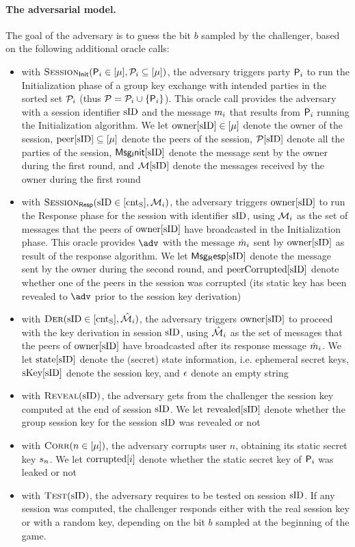 \paragraph{The adversarial model.}
The goal of the adversary is to guess the bit $b$ sampled by the challenger, based on the following additional oracle calls:
\begin{itemize}
	\item with $\GakeIniO ( \GIni  \in [\mu], \PartySet_{i} \subseteq [\mu])$, the adversary triggers party $\User[i]$ to run the Initialization phase of a group key exchange with intended parties in the sorted set $\PartySet_{i}$ (thus $\PartySet = \PartySet_{i}  \cup \{\User[i]\}$). This oracle call provides the adversary with a session identifier $\sID$ and the message $\GakeIniMes_{i}$ that results from $\User[i]$ running the Initialization algorithm. We let $\owner[\sID] \in [\mu]$ denote the owner of the session, $\peer[\sID] \subseteq[\mu]$ denote the peers of the session, $\GakeUSet[\sID]$ denote all the parties of the session, $\GIniMes[\sID]$ denote the message sent by the owner during the first round, and $\GIniMesSet[\sID]$ denote the messages received by the owner during the first round
	\item with $\GakeResO(\sID \in [\cntS], \GakeIniMesSet[{i}] )$, the adversary triggers $\owner[\sID]$ to run the Response phase for the session with identifier $\sID$, using $\GakeIniMesSet[i]$ as the set of messages that the peers of $\owner[\sID]$ have broadcasted in the Initialization phase. This oracle provides $\adv$ with the message $\GakeResMes_{i}$ sent by $\owner[\sID]$ as result of the response algorithm. We let $\GResMes[\sID]$ denote the message sent by the owner during the second round, and $\peercorrupted[\sID]$ denote whether one of the peers in the session was corrupted (its static key has been revealed to $\adv$ prior to the session key derivation)
	\item with $\GakeDerO(\GakeResUsID \in [\cntS],  \GakeResMesSet[{i}])$, the adversary triggers $\owner[\sID]$ to proceed with the key derivation in session $\sID$, using $\GakeResMesSet[i]$ as the set of messages that the peers of $\owner[\sID]$ have broadcasted after its response message $\GakeResMes_{i}$. We let $\Gstates[\sID]$ denote the (secret) state information, i.e. ephemeral secret keys, $\ListGakeSessKey[\sID]$ denote the session key, and $\emptystr$ denote an empty string
	\item with $\RevealO(\sID)$, the adversary gets from the challenger the session key computed at the end of session $\sID$. We let $\revealed[\sID]$ denote whether the group session key for the session $\sID$ was revealed or not
	\item with $\CorruptO(n \in [\mu])$, the adversary corrupts user $n$, obtaining its static secret key $\ssk_n$. We let $\corrupted[{i}]$ denote whether the static secret key of  $\User[{i}]$ was leaked or not
	\item with $\TestO(\sID)$, the adversary requires to be tested on session $\sID$. If any session was computed, the challenger responds either with the real session key or with a random key, depending on the bit $b$ sampled at the beginning of the game.
\end{itemize}

